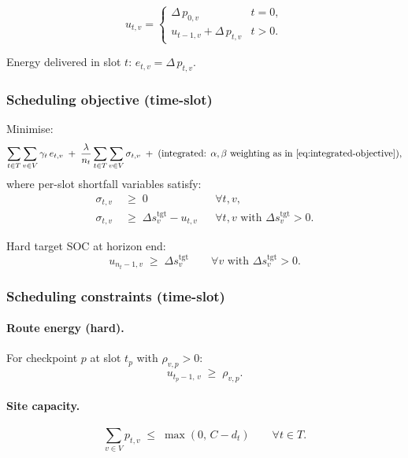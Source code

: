 \documentclass[11pt,a4paper]{article}
\newcommand{\1}{\mathbf{1}}
\begin{document}
\begin{equation}
  u_{t,v} =
  \begin{cases}
    \Delta\, p_{0,v} & t = 0, \\[4pt]
    u_{t-1,v} + \Delta\, p_{t,v} & t > 0.
  \end{cases}
\end{equation}

Energy delivered in slot $t$: $e_{t,v} = \Delta\, p_{t,v}$.

\subsubsection{Scheduling objective (time-slot)}

Minimise:
\begin{equation}
  \label{eq:sched-timeslot-obj}
  \sum_{t \in T}\sum_{v \in V} \gamma_t\, e_{t,v}
  \;+\;
  \frac{\lambda}{n_t}\sum_{t \in T}\sum_{v \in V} \sigma_{t,v}
  \;+\;
  \text{(integrated: } \alpha,\beta \text{ weighting as in \eqref{eq:integrated-objective})},
\end{equation}
where per-slot shortfall variables satisfy:
\begin{align}
  \sigma_{t,v} &\;\ge\; 0 && \forall t,v, \\
  \sigma_{t,v} &\;\ge\; \Delta s_v^{\mathrm{tgt}} - u_{t,v} && \forall t,v \text{ with } \Delta s_v^{\mathrm{tgt}} > 0.
\end{align}

Hard target SOC at horizon end:
\begin{equation}
  u_{n_t-1,v} \;\ge\; \Delta s_v^{\mathrm{tgt}} \qquad \forall v \text{ with } \Delta s_v^{\mathrm{tgt}} > 0.
\end{equation}

\subsubsection{Scheduling constraints (time-slot)}

\paragraph{Route energy (hard).}
For checkpoint $p$ at slot $t_p$ with $\rho_{v,p} > 0$:
\begin{equation}
  u_{t_p - 1,\, v} \;\ge\; \rho_{v,p}.
\end{equation}

\paragraph{Site capacity.}
\begin{equation}
  \sum_{v \in V} p_{t,v} \;\le\; \max(0,\, C - d_t) \qquad \forall t \in T.
\end{equation}
\end{document}

